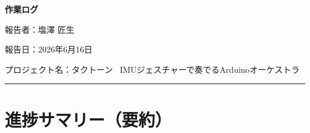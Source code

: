 \documentclass[uplatex,dvipdfmx,a4paper,11pt]{jsarticle}
\newcommand{\sectionrule}{\par\medskip\noindent\rule{\linewidth}{0.6pt}\par\medskip}
\begin{document}
{\LARGE\bfseries 作業ログ}\par\bigskip

報告者：塩澤 匠生

報告日：2026年6月16日

プロジェクト名：タクトーン~ IMUジェスチャーで奏でるArduinoオーケストラ~ \\

\sectionrule

\section{進捗サマリー（要約）}
\end{document}
